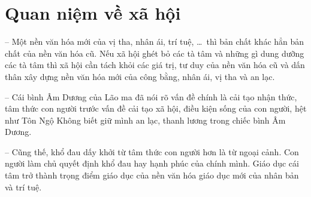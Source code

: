 \section{Quan niệm về xã hội} %
\label{sec:74_75_xa_hoi}

-- Một nền văn hóa mới của vị tha, nhân ái, trí tuệ, \ldots ~thì bản chất khác hẳn bản chất của nền văn hóa cũ. Nếu xã hội ghét bỏ các tà tâm và những gì dung dưỡng các tà tâm thì xã hội cần tách khỏi các giá trị, tư duy của nền văn hóa cũ và dấn thân xây dựng nền văn hóa mới của công bằng, nhân ái, vị tha và an lạc.

-- Cái bình Âm Dương của Lão ma đã nói rõ vấn đề chính là cải tạo nhận thức, tâm thức con người trước vấn đề cải tạo xã hội, điều kiện sống của con người, hệt như Tôn Ngộ Không biết giữ mình an lạc, thanh lương trong chiếc bình Âm Dương.

-- Cũng thế, khổ đau dấy khởi từ tâm thức con người hơn là từ ngoại cảnh. Con người làm chủ quyết định khổ đau hay hạnh phúc của chính mình. Giáo dục cái tâm trở thành trọng điểm giáo dục của nền văn hóa giáo dục mới của nhân bản và trí tuệ.
